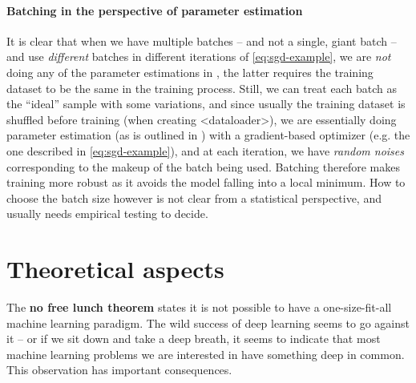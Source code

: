 \documentclass[hyperref, a4paper, 12pt]{report}
\newcommand*{\concept}[1]{{\textbf{#1}}}
\def\texttt#1{<#1>}%
\newcommand{\shortcode}[1]{\texttt{#1}}
\begin{document}
\paragraph*{Batching in the perspective of parameter estimation}
It is clear that when we have multiple batches -- and not a single, giant batch -- and use \emph{different} batches in different iterations of \eqref{eq:sgd-example},
we are \emph{not} doing any of the parameter estimations in ,
the latter requires the training dataset to be the same in the training process.
Still, we can treat each batch as the ``ideal'' sample with some variations,
and since usually the training dataset is shuffled before training (when creating \shortcode{dataloader}),
we are essentially doing parameter estimation (as is outlined in )
with a gradient-based optimizer (e.g. the one described in \eqref{eq:sgd-example}),
and at each iteration, we have \emph{random noises} corresponding to the makeup of the batch being used.
Batching therefore makes training more robust as it avoids the model falling into a local minimum.
How to choose the batch size however is not clear from a statistical perspective, and usually needs empirical testing to decide.

\section{Theoretical aspects}\label{sec:theoretical-aspects}

The \concept{no free lunch theorem} states it is not possible to have a one-size-fit-all machine learning paradigm.
The wild success of deep learning seems to go against it -- or if we sit down and take a deep breath, it seems to indicate that most machine learning problems we are interested in have something deep in common.
This observation has important consequences.
\end{document}

